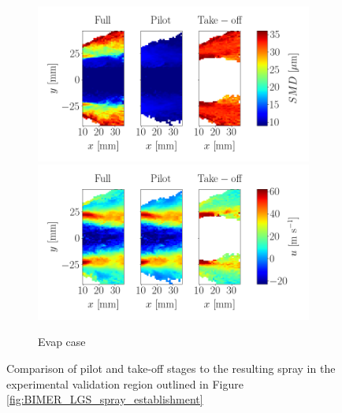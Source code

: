 \begin{figure}[h!]
\begin{subfigure}[b]{1.0\textwidth}
	\centering
	\includegraphics[scale=0.5]{./part3_applications/figures_ch9_lagrangian/simus_pilot_takeoff_comparison/evap_SMD.png}
\hspace*{0.1in}
   \includegraphics[scale=0.5]{./part3_applications/figures_ch9_lagrangian/simus_pilot_takeoff_comparison/evap_u_axial.png}
   \caption{Evap case}
\end{subfigure}
\caption[Comparison of pilot and take-off stages to the resulting
spray ]{Comparison of pilot and take-off stages to the resulting
spray in the experimental validation region outlined in Figure \ref{fig:BIMER_LGS_spray_establishment}}
\label{fig:comparison_pilot_takeoff_maps_BIMER_lgs}
\end{figure}


